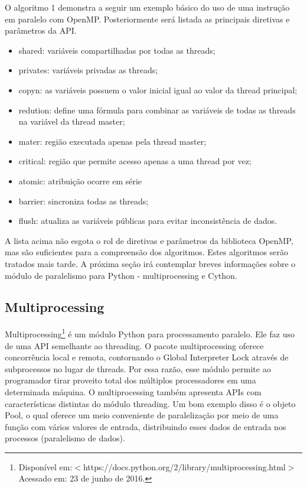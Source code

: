 \documentclass[a4paper,12pt]{article}
\begin{document}
O algoritmo 1 demonstra a seguir um exemplo básico do uso de uma instrução em paralelo com OpenMP. Posteriormente será listada as principais diretivas e parâmetros da API.  

\begin{itemize}
  \item shared: variáveis compartilhadas por todas as threads;
  \item privates: variáveis privadas as threads;
  \item copyn: as variáveis possuem o valor inicial igual ao valor da thread principal;
  \item redution: define uma fórmula para combinar as variáveis de todas as threads na variável da thread master;
  \item mater: região executada apenas pela thread master;
  \item critical: região que permite acesso apenas a uma thread por vez;
  \item atomic: atribuição ocorre em série
  \item barrier: sincroniza todas as threads;
  \item flush: atualiza as variáveis públicas para evitar inconsistência de dados.
\end{itemize}

A lista acima não esgota o rol de diretivas e parâmetros da biblioteca OpenMP, mas são suficientes para a compreensão dos algoritmos. Estes algoritmos serão tratados mais tarde. A próxima seção irá contemplar breves informações sobre o módulo de paralelismo para Python - multiprocessing e Cython. 

\subsection{Multiprocessing}
Multiprocessing\footnote{Disponível em:$<$https://docs.python.org/2/library/multiprocessing.html$>$ Acessado em: 23 de junho de 2016.} é um módulo Python para processamento paralelo. Ele faz uso de uma API semelhante ao threading. 
O pacote multiprocessing oferece concorrência local e remota, contornando o Global Interpreter Lock através de subprocessos no lugar de threads. Por essa razão, esse módulo permite ao programador tirar proveito total dos múltiplos processadores em uma determinada máquina.
O multiprocessing também apresenta APIs com características distintas do módulo threading. Um bom exemplo disso é o objeto Pool, o qual oferece um meio conveniente de paralelização por meio de uma função com vários valores de entrada, distribuindo esses dados de entrada nos processos (paralelismo de dados). 
\end{document}
